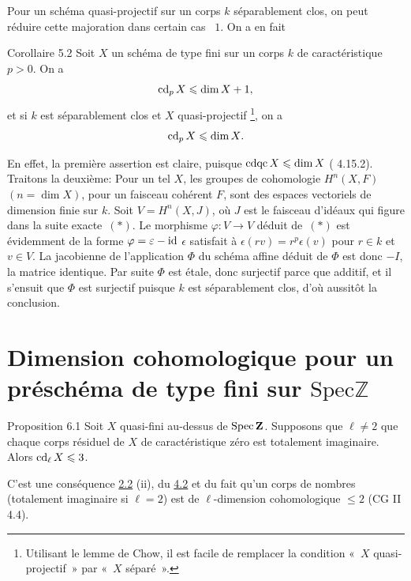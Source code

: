 \documentclass[10pt]{../fichiers-configuration-latex/smfart}
\begin{document}
Pour un schéma quasi-projectif sur un corps $k$ séparablement clos, on
peut réduire cette majoration dans certain cas  $1$. On a en fait

\begin{enonce*}{Corollaire 5.2}
Soit $X$ un schéma de type fini sur un corps $k$ de caractéristique
$p>0$. On a
$$
\operatorname{cd}_pX\leqslant \dim X+1{},
$$
et si $k$ est séparablement clos et $X$ quasi-projectif
\footnote[1]{Utilisant le lemme de Chow, il est facile de remplacer
  la condition « $X$ quasi-projectif » par « $X$ séparé ».},
on a
$$
\operatorname{cd}_pX\leqslant \dim X{}.
$$
\end{enonce*}

En effet, la première assertion est claire, puisque $\operatorname{cdqc} X\leqslant \dim
X$ (\cite{SGA4-10:6} 4.15.2). Traitons la deuxième: Pour un tel $X$, les groupes de
cohomologie $H^n(X,F)$ $(n=\dim X)$, pour un faisceau cohérent $F$,
sont des espaces vectoriels de dimension finie sur $k$. Soit
$V=H^n(X,J)$, où $J$ est le faisceau d'idéaux qui figure dans la suite
exacte $(\ast)$. Le morphisme $\varphi:V\rightarrow V$ déduit de $(\ast)$
est évidemment de la forme $\varphi=\varepsilon-\operatorname{id}$ 
$\epsilon$ satisfait à $\epsilon(rv)=r^p\epsilon(v)$ pour $r\in k$ et
$v\in V$. La jacobienne de l'application $\Phi$ du schéma affine
déduit de $\Phi$ est donc $-I$,  la matrice identique. Par suite
$\Phi$ est étale, donc surjectif parce que additif, et il s'ensuit que
$\Phi$ est surjectif puisque $k$ est séparablement clos, d'où aussitôt
la conclusion.

\section{Dimension cohomologique pour un préschéma de type fini sur $\mathrm{Spec} ℤ$}\pageoriginale

\begin{enonce*}{Proposition 6.1}
Soit $X$ quasi-fini au-dessus de $\operatorname{Spec} \mathbf{Z}$. Supposons que
$\ell\neq 2$  que chaque corps résiduel de $X$ de caractéristique
zéro est totalement imaginaire. Alors $\operatorname{cd}_{\ell}X\leqslant 3$.
\end{enonce*}

C'est une conséquence   \hyperref[X.thm2.2]{2.2} (ii), du  \hyperref[X.cor4.2]{4.2}
et du fait qu'un corps de nombres (totalement imaginaire si $\ell =2$) est
de $\ell$-dimension cohomologique $\leq 2$ (CG II 4.4).
\end{document}
